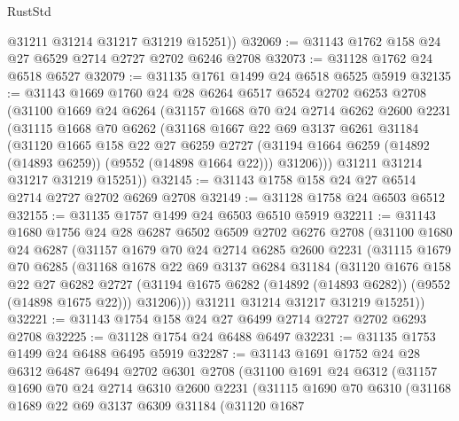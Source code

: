 \begin{lexlean}{RustStd}
\begin{coremodule}
        @31211
        @31214
        @31217
        @31219
        @15251))
@32069 := @31143 @1762 @158 @24 @27 @6529 @2714 @2727 @2702 @6246 @2708
@32073 := @31128 @1762 @24 @6518 @6527
@32079 := @31135 @1761 @1499 @24 @6518 @6525 @5919
@32135 := @31143
    @1669
    @1760
    @24
    @28
    @6264
    @6517
    @6524
    @2702
    @6253
    @2708
    (@31100
      @1669
      @24
      @6264
      (@31157
        @1668
        @70
        @24
        @2714
        @6262
        @2600
        @2231
        (@31115
          @1668
          @70
          @6262
          (@31168
            @1667
            @22
            @69
            @3137
            @6261
            @31184
            (@31120
              @1665
              @158
              @22
              @27
              @6259
              @2727
              (@31194 @1664 @6259 (@14892 (@14893 @6259)) (@9552 (@14898 @1664 @22)))
              @31206)))
        @31211
        @31214
        @31217
        @31219
        @15251))
@32145 := @31143 @1758 @158 @24 @27 @6514 @2714 @2727 @2702 @6269 @2708
@32149 := @31128 @1758 @24 @6503 @6512
@32155 := @31135 @1757 @1499 @24 @6503 @6510 @5919
@32211 := @31143
    @1680
    @1756
    @24
    @28
    @6287
    @6502
    @6509
    @2702
    @6276
    @2708
    (@31100
      @1680
      @24
      @6287
      (@31157
        @1679
        @70
        @24
        @2714
        @6285
        @2600
        @2231
        (@31115
          @1679
          @70
          @6285
          (@31168
            @1678
            @22
            @69
            @3137
            @6284
            @31184
            (@31120
              @1676
              @158
              @22
              @27
              @6282
              @2727
              (@31194 @1675 @6282 (@14892 (@14893 @6282)) (@9552 (@14898 @1675 @22)))
              @31206)))
        @31211
        @31214
        @31217
        @31219
        @15251))
@32221 := @31143 @1754 @158 @24 @27 @6499 @2714 @2727 @2702 @6293 @2708
@32225 := @31128 @1754 @24 @6488 @6497
@32231 := @31135 @1753 @1499 @24 @6488 @6495 @5919
@32287 := @31143
    @1691
    @1752
    @24
    @28
    @6312
    @6487
    @6494
    @2702
    @6301
    @2708
    (@31100
      @1691
      @24
      @6312
      (@31157
        @1690
        @70
        @24
        @2714
        @6310
        @2600
        @2231
        (@31115
          @1690
          @70
          @6310
          (@31168
            @1689
            @22
            @69
            @3137
            @6309
            @31184
            (@31120
              @1687

\end{coremodule}
\end{lexlean}
